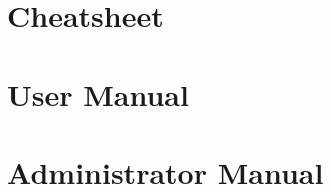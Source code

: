 \documentclass[10pt,a4paper,oneside]{report}
\begin{document}
\setcounter{tocdepth}{1}
\dominitoc
\dominilof
\dominilot
\tableofcontents
\clearpage
\listoffigures
\listoftables















\chapter{Cheatsheet}


\chapter{User Manual}


\chapter{Administrator Manual}




\end{document}
